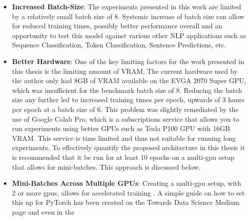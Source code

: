 \documentclass[a4paper,12pt]{report}
\begin{document}
    \begin{itemize}

    	\item \textbf{Increased Batch-Size}: The experiments presented in this work are limited by a relatively small batch size of 8. Systemic increase of batch size can allow for reduced training times, possibly better performance overall and an opportunity to test this model against various other NLP applications such as Sequence Classification, Token Classification, Sentence Predictions, etc.
    	\item \textbf{Better Hardware}: One of the key limiting factors for the work presented in this thesis is the limiting amount of VRAM, The current hardware used by the author only had 8GB of VRAM available on the EVGA 2070 Super GPU, which was insufficient for the benchmark batch size of 8. Reducing the batch size any further led to increased training times per epoch, upwards of 3 hours per epoch at a batch size of 6. This problem was slightly remediated by the use of Google Colab Pro, which is a subscriptions service that allows you to run experiments using better GPUs such as Tesla P100 GPU with 16GB VRAM. This service is time limited and thus not suitable for running long experiments. To effectively quantify the proposed architecture in this thesis it is recommended that it be run for at least 10 epochs on a multi-gpu setup that allows for mini-batches. This approach is discussed below.
    	\item \textbf{Mini-Batches Across Multiple GPUs}: Creating a multi-gpu setup, with 2 or more gpus, allows for accelerated training \citep{multigpu1}. A simple guide on how to set this up for PyTorch has been created on the Towards Data Science Medium page \citep{multigpu2} and even in the
    \end{itemize}
\end{document}
